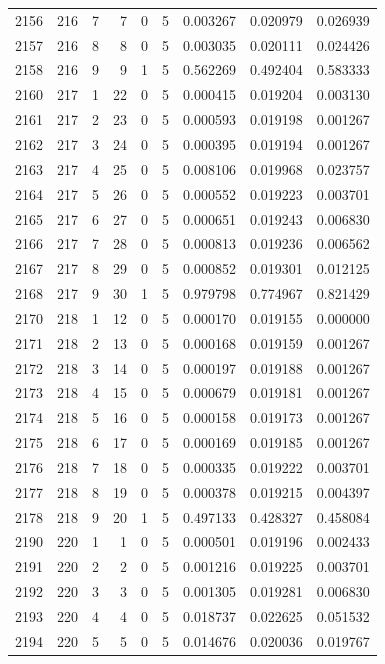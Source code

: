 \begin{longtable}{rrrrrrrrr}
2156 & 216 & 7 & 7 & 0 & 5 & 0.003267 & 0.020979 & 0.026939 \\
2157 & 216 & 8 & 8 & 0 & 5 & 0.003035 & 0.020111 & 0.024426 \\
2158 & 216 & 9 & 9 & 1 & 5 & 0.562269 & 0.492404 & 0.583333 \\
2160 & 217 & 1 & 22 & 0 & 5 & 0.000415 & 0.019204 & 0.003130 \\
2161 & 217 & 2 & 23 & 0 & 5 & 0.000593 & 0.019198 & 0.001267 \\
2162 & 217 & 3 & 24 & 0 & 5 & 0.000395 & 0.019194 & 0.001267 \\
2163 & 217 & 4 & 25 & 0 & 5 & 0.008106 & 0.019968 & 0.023757 \\
2164 & 217 & 5 & 26 & 0 & 5 & 0.000552 & 0.019223 & 0.003701 \\
2165 & 217 & 6 & 27 & 0 & 5 & 0.000651 & 0.019243 & 0.006830 \\
2166 & 217 & 7 & 28 & 0 & 5 & 0.000813 & 0.019236 & 0.006562 \\
2167 & 217 & 8 & 29 & 0 & 5 & 0.000852 & 0.019301 & 0.012125 \\
2168 & 217 & 9 & 30 & 1 & 5 & 0.979798 & 0.774967 & 0.821429 \\
2170 & 218 & 1 & 12 & 0 & 5 & 0.000170 & 0.019155 & 0.000000 \\
2171 & 218 & 2 & 13 & 0 & 5 & 0.000168 & 0.019159 & 0.001267 \\
2172 & 218 & 3 & 14 & 0 & 5 & 0.000197 & 0.019188 & 0.001267 \\
2173 & 218 & 4 & 15 & 0 & 5 & 0.000679 & 0.019181 & 0.001267 \\
2174 & 218 & 5 & 16 & 0 & 5 & 0.000158 & 0.019173 & 0.001267 \\
2175 & 218 & 6 & 17 & 0 & 5 & 0.000169 & 0.019185 & 0.001267 \\
2176 & 218 & 7 & 18 & 0 & 5 & 0.000335 & 0.019222 & 0.003701 \\
2177 & 218 & 8 & 19 & 0 & 5 & 0.000378 & 0.019215 & 0.004397 \\
2178 & 218 & 9 & 20 & 1 & 5 & 0.497133 & 0.428327 & 0.458084 \\
2190 & 220 & 1 & 1 & 0 & 5 & 0.000501 & 0.019196 & 0.002433 \\
2191 & 220 & 2 & 2 & 0 & 5 & 0.001216 & 0.019225 & 0.003701 \\
2192 & 220 & 3 & 3 & 0 & 5 & 0.001305 & 0.019281 & 0.006830 \\
2193 & 220 & 4 & 4 & 0 & 5 & 0.018737 & 0.022625 & 0.051532 \\
2194 & 220 & 5 & 5 & 0 & 5 & 0.014676 & 0.020036 & 0.019767 \\

\end{longtable}
